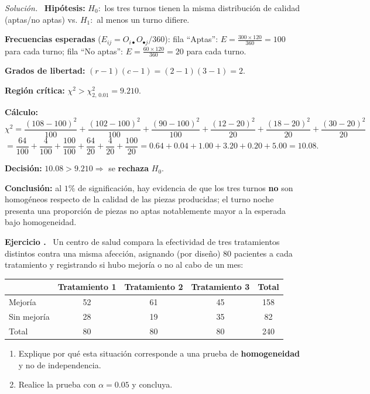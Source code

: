 \documentclass[11pt,a4paper]{article}
\newcounter{ejnum}
\newenvironment{ejercicio}{\refstepcounter{ejnum}\par\medskip\noindent\textbf{Ejercicio \theejnum.}~}{\par}
\newenvironment{solucion}{\par\noindent\textit{Solución.}~}{\par\vspace{1em}}
\begin{document}
\begin{solucion}
\textbf{Hipótesis:} $H_0:$ los tres turnos tienen la misma distribución de calidad (aptas/no aptas) vs. $H_1:$ al menos un turno difiere.

\textbf{Frecuencias esperadas} ($E_{ij}=O_{i\bullet}O_{\bullet j}/360$): fila ``Aptas'': $E=\frac{300\times120}{360}=100$ para cada turno; fila ``No aptas'': $E=\frac{60\times120}{360}=20$ para cada turno.

\textbf{Grados de libertad:} $(r-1)(c-1)=(2-1)(3-1)=2$.

\textbf{Región crítica:} $\chi^2>\chi^2_{2,\,0.01}=9.210$.

\textbf{Cálculo:}
\[
\chi^2=\frac{(108-100)^2}{100}+\frac{(102-100)^2}{100}+\frac{(90-100)^2}{100}+\frac{(12-20)^2}{20}+\frac{(18-20)^2}{20}+\frac{(30-20)^2}{20}
\]
\[
=\frac{64}{100}+\frac{4}{100}+\frac{100}{100}+\frac{64}{20}+\frac{4}{20}+\frac{100}{20}=0.64+0.04+1.00+3.20+0.20+5.00=10.08.
\]

\textbf{Decisión:} $10.08>9.210\Rightarrow$ se \textbf{rechaza} $H_0$.

\textbf{Conclusión:} al $1\%$ de significación, hay evidencia de que los tres turnos \textbf{no} son homogéneos respecto de la calidad de las piezas producidas; el turno noche presenta una proporción de piezas no aptas notablemente mayor a la esperada bajo homogeneidad.
\end{solucion}

\begin{ejercicio}
Un centro de salud compara la efectividad de tres tratamientos distintos contra una misma afección, asignando (por diseño) $80$ pacientes a cada tratamiento y registrando si hubo mejoría o no al cabo de un mes:
\begin{center}
\begin{tabular}{@{}lccc|c@{}}
\toprule
 & Tratamiento 1 & Tratamiento 2 & Tratamiento 3 & Total \\
\midrule
Mejoría & 52 & 61 & 45 & 158 \\
Sin mejoría & 28 & 19 & 35 & 82 \\
\midrule
Total & 80 & 80 & 80 & 240 \\
\bottomrule
\end{tabular}
\end{center}
\begin{enumerate}[label=(\alph*)]
\item Explique por qué esta situación corresponde a una prueba de \textbf{homogeneidad} y no de independencia.
\item Realice la prueba con $\alpha=0.05$ y concluya.
\end{enumerate}
\end{ejercicio}
\end{document}
